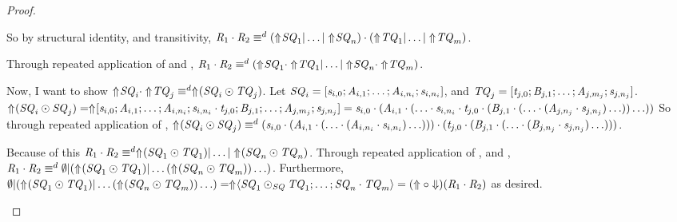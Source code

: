 \documentclass[numbers,10pt,preprint\ifanon ,nocopyrightspace\fi]{sigplanconf}
\begin{document}
\begin{proof}
\begin{case}[\ConcatRegexType{}]
    So by structural \ConcatRegexType{} identity, and transitivity,
    $\mathit{R}_1 \cdot \mathit{R}_2 \equiv^d
    (\Uparrow\mkern-4mu \mathit{SQ}_1 | \ldots | \Uparrow\mkern-4mu \mathit{SQ}_n)
    \cdot
    (\Uparrow\mkern-4mu \mathit{TQ}_1 | \ldots | \Uparrow\mkern-4mu \mathit{TQ}_m)$.

    Through repeated application of \DistributivityLeftRule{} and
    \DistributivityRightRule{},
    $\mathit{R}_1 \cdot \mathit{R}_2 \equiv^d
    (\Uparrow\mkern-4mu \mathit{SQ}_1\cdot\Uparrow\mkern-4mu \mathit{TQ}_1 | \ldots |
    \Uparrow\mkern-4mu \mathit{SQ}_n\cdot\Uparrow\mkern-4mu \mathit{TQ}_m)$.

    Now, I want to show $\Uparrow\mkern-4mu \mathit{SQ}_i \cdot \Uparrow\mkern-4mu \mathit{TQ}_j
    \equiv^d \Uparrow\mkern-4mu (\mathit{SQ}_i \odot \mathit{TQ}_j)$.
    Let $\mathit{SQ}_i =
    [\mathit{s}_{i,0};\mathit{A}_{i,1};\ldots;\mathit{A}_{i,n_i};\mathit{s}_{i,n_i}]$,
    and $\mathit{TQ}_j =
    [\mathit{t}_{j,0};\mathit{B}_{j,1};\ldots;\mathit{A}_{j,m_j};\mathit{s}_{j,n_j}]$.
    $\Uparrow\mkern-4mu (\mathit{SQ}_i \odot \mathit{SQ}_j) =
    \Uparrow\mkern-4mu [\mathit{s}_{i,0};\mathit{A}_{i,1};\ldots;
        \mathit{A}_{i,n_i};\mathit{s}_{i,n_i}\cdot\mathit{t}_{j,0};\mathit{B}_{j,1};
        \ldots;\mathit{A}_{j,m_j};\mathit{s}_{j,n_j}] =
    \mathit{s}_{i,0} \cdot (\mathit{A}_{i,1} \cdot (\ldots \cdot \mathit{s}_{i,n_i}
    \cdot \mathit{t}_{j,0} \cdot (\mathit{B}_{j,1} \cdot (\ldots \cdot
    (\mathit{A}_{j,n_j} \cdot \mathit{s}_{j,n_j})\ldots))\ldots))$
    So through repeated application of \ConcatAssocRule{},
    $\Uparrow\mkern-4mu (\mathit{SQ}_i \odot \mathit{SQ}_j) \equiv^d
    (\mathit{s}_{i,0} \cdot (\mathit{A}_{i,1} \cdot (\ldots \cdot (\mathit{A}_{i,n_i}
    \cdot \mathit{s}_{i,n_i})\ldots))) \cdot (\mathit{t}_{j,0} \cdot
    (\mathit{B}_{j,1} \cdot (\ldots \cdot (\mathit{B}_{j,n_j} \cdot
    \mathit{s}_{j,n_j})\ldots)))$.

    Because of this 
    $\mathit{R}_1 \cdot \mathit{R}_2 \equiv^d
    \Uparrow\mkern-4mu (\mathit{SQ}_1\odot\mathit{TQ}_1) | \ldots |
    \Uparrow\mkern-4mu (\mathit{SQ}_n\odot\mathit{TQ}_n)$.
    Through repeated application of \OrAssociativityRule{}, and \OrIdentityRule{},
    $\mathit{R}_1 \cdot \mathit{R}_2 \equiv^d
    \emptyset | (\Uparrow\mkern-4mu (\mathit{SQ}_1\odot\mathit{TQ}_1) | \ldots
    (\Uparrow\mkern-4mu (\mathit{SQ}_n\odot\mathit{TQ}_m))\ldots)$.
    Furthermore, $\emptyset | (\Uparrow\mkern-4mu (\mathit{SQ}_1\odot\mathit{TQ}_1) | \ldots
    (\Uparrow\mkern-4mu (\mathit{SQ}_n\odot\mathit{TQ}_m))\ldots) =
    \Uparrow\mkern-4mu \langle\mathit{SQ}_1\odot_{\mathit{SQ}}\mathit{TQ}_1;\ldots;
        \mathit{SQ}_n\cdot\mathit{TQ}_m\rangle =
    (\Uparrow \circ \Downarrow)(\mathit{R}_1 \cdot \mathit{R}_2)$ as desired.
  \end{case}


\end{proof}
\end{document}
